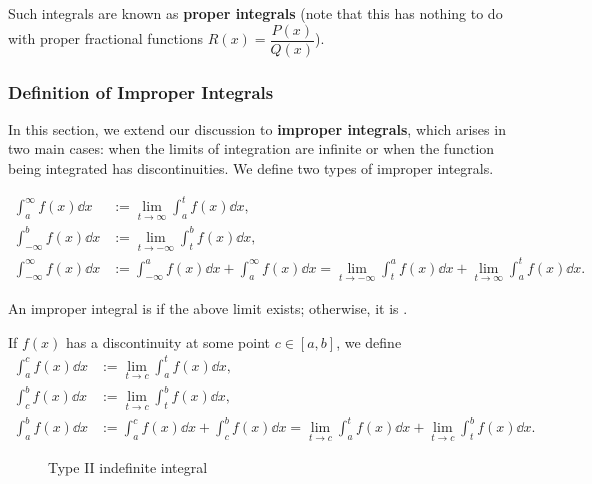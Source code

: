 Such integrals are known as \textbf{proper integrals} (note that this has nothing to do with proper fractional functions $R(x) = \dfrac{P(x)}{Q(x)}$).


\subsubsection{Definition of Improper Integrals}

In this section, we extend our discussion to \textbf{improper integrals}, which arises in two main cases: when the limits of integration are infinite or when the function being integrated has discontinuities.
We define two types of improper integrals.

\begin{defn}
    \begin{align*}
        \int_a^\infty f(x) \dd x &:= \lim_{t \to \infty} \int_a^t f(x) \dd x, \\
        \int_{-\infty}^b f(x) \dd x &:= \lim_{t \to -\infty} \int_t^b f(x) \dd x,\\
        \int_{-\infty}^\infty f(x) \dd x &:= \int_{-\infty}^a f(x) \dd x + \int_a^\infty f(x) \dd x = \lim_{t \to -\infty} \int_t^a f(x) \dd x + \lim_{t \to \infty} \int_a^t f(x) \dd x.
    \end{align*}
\end{defn}

\begin{defn}
    An improper integral is  if the above limit exists; otherwise, it is .
\end{defn}

\begin{defn}
If $f(x)$ has a discontinuity at some point $c \in [a,b]$, we define
    \begin{align*}
        \int_a^c f(x) \dd x &:= \lim_{t \to c} \int_a^t f(x) \dd x, \\
        \int_{c}^b f(x) \dd x &:= \lim_{t \to c} \int_t^b f(x) \dd x,\\
        \int_a^b f(x) \dd x &:= \int_a^c f(x) \dd x + \int_c^b f(x) \dd x = \lim_{t \to c} \int_a^t f(x) \dd x + \lim_{t \to c} \int_t^b f(x) \dd x.
    \end{align*}
\end{defn}

\begin{figure}[H]
    \centering
    \resizebox{0.4\textwidth}{!}{} %
    \caption{Type II indefinite integral}
    \label{fig:type ii indefinite integral}
\end{figure}

